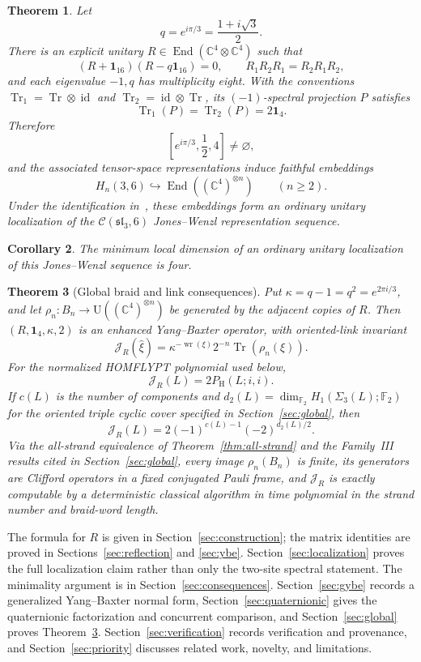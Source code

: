 \documentclass[11pt]{article}
\newtheorem{theorem}{Theorem}[section]
\newtheorem{corollary}[theorem]{Corollary}
\theoremstyle{remark}
\newcommand{\Id}{\mathbf 1}
\newcommand{\Tr}{\operatorname{Tr}}
\newcommand{\End}{\operatorname{End}}
\newcommand{\bbC}{\mathbb C}
\newcommand{\cC}{\mathcal C}
\begin{document}
\begin{theorem}\label{thm:main}
Let
\[
  q=e^{i\pi/3}=\frac{1+i\sqrt3}{2}.
\]
There is an explicit unitary \(R\in\End(\bbC^4\otimes\bbC^4)\) such that
\[
  (R+\Id_{16})(R-q\Id_{16})=0,\qquad
  R_1R_2R_1=R_2R_1R_2,
\]
and each eigenvalue \(-1,q\) has multiplicity eight.  With the conventions
\(\Tr_1=\Tr\otimes\operatorname{id}\) and
\(\Tr_2=\operatorname{id}\otimes\Tr\), its
\((-1)\)-spectral projection \(P\) satisfies
\[
  \Tr_1(P)=\Tr_2(P)=2\Id_4.
\]
Therefore
\[
  \left[e^{i\pi/3},\frac12,4\right]\ne\varnothing,
\]
and the associated tensor-space representations induce faithful
embeddings
\[
  H_n(3,6)\hookrightarrow\End\!\left((\bbC^4)^{\otimes n}\right)
  \qquad(n\ge2).
\]
Under the identification in~\cite[\S5.6]{GHR2013}, these embeddings form an
ordinary unitary localization of the
\(\cC(\mathfrak{sl}_3,6)\) Jones--Wenzl representation sequence.
\end{theorem}

\begin{corollary}\label{cor:minimal}
The minimum local dimension of an ordinary unitary localization of this
Jones--Wenzl sequence is four.
\end{corollary}

\begin{theorem}[Global braid and link consequences]\label{thm:global-summary}
Put \(\kappa=q-1=q^2=e^{2\pi i/3}\), and let
\(\rho_n:B_n\to\mathrm U((\bbC^4)^{\otimes n})\) be generated by the adjacent copies of
\(R\).  Then \((R,\Id_4,\kappa,2)\) is an enhanced Yang--Baxter operator, with
oriented-link invariant
\[
  \mathcal J_R(\widehat\xi)
  =\kappa^{-\operatorname{wr}(\xi)}2^{-n}\Tr(\rho_n(\xi)).
\]
For the normalized HOMFLYPT polynomial used below,
\[
  \mathcal J_R(L)=2P_{\mathrm H}(L;i,i).
\]
If \(c(L)\) is the number of components and
\(d_2(L)=\dim_{\mathbb F_2}H_1(\Sigma_3(L);\mathbb F_2)\) for the oriented
triple cyclic cover specified in Section~\ref{sec:global}, then
\[
  \mathcal J_R(L)=2(-1)^{c(L)-1}(-2)^{d_2(L)/2}.
\]
Via the all-strand equivalence of Theorem~\ref{thm:all-strand} and the
Family~III results cited in Section~\ref{sec:global}, every image
\(\rho_n(B_n)\) is finite, its generators are Clifford operators in a fixed
conjugated Pauli frame, and \(\mathcal J_R\) is exactly computable by a
deterministic classical algorithm in time polynomial in the strand number and
braid-word length.
\end{theorem}

The formula for \(R\) is given in Section~\ref{sec:construction}; the matrix
identities are proved in Sections~\ref{sec:reflection} and
\ref{sec:ybe}.  Section~\ref{sec:localization} proves the full localization
claim rather than only the two-site spectral statement.  The minimality
argument is in Section~\ref{sec:consequences}.  Section~\ref{sec:gybe}
records a generalized Yang--Baxter normal form, Section~\ref{sec:quaternionic}
gives the quaternionic factorization and concurrent comparison, and
Section~\ref{sec:global} proves Theorem~\ref{thm:global-summary}.
Section~\ref{sec:verification} records verification and provenance, and
Section~\ref{sec:priority} discusses related work, novelty, and limitations.
\end{document}
